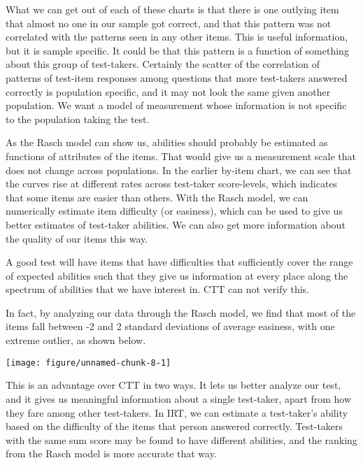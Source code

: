 \documentclass{article}\usepackage[]{graphicx}\usepackage[]{color}
\newenvironment{knitrout}{}{} %
\begin{document}
\begin{enumerate}
What we can get out of each of these charts is that there is one outlying item that almost no one in our sample got correct, and that this pattern was not correlated with the patterns seen in any other items. This is useful information, but it is sample specific. It could be that this pattern is a function of something about this group of test-takers. Certainly the scatter of the correlation of patterns of test-item responses among questions that more test-takers answered correctly is population specific, and it may not look the same given another population. We want a model of measurement whose information is not specific to the population taking the test.
\raggedright

As the Rasch model can show us, abilities should probably be estimated as functions of attributes of the items. That would give us a measurement scale that does not change across populations. In the earlier by-item chart, we can see that the curves rise at different rates across test-taker score-levels, which indicates that some items are easier than others. With the Rasch model, we can numerically estimate item difficulty (or easiness), which can be used to give us better estimates of test-taker abilities. We can also get more information about the quality of our items this way.
\raggedright

A good test will have items that have difficulties that sufficiently cover the range of expected abilities such that they give us information at every place along the spectrum of abilities that we have interest in. CTT can not verify this.
\raggedright

In fact, by analyzing our data through the Rasch model, we find that most of the items fall between -2 and 2 standard deviations of average easiness, with one extreme outlier, as shown below.

\centering
\begin{knitrout}
\color{fgcolor}

{\centering \texttt{[image: figure/unnamed-chunk-8-1]} 

}



\end{knitrout}
\raggedright
This is an advantage over CTT in two ways. It lets us better analyze our test, and it gives us meaningful information about a single test-taker, apart from how they fare among other test-takers. In IRT, we can estimate a test-taker's ability based on the difficulty of the items that person answered correctly. Test-takers with the same sum score may be found to have different abilities, and the ranking from the Rasch model is more accurate that way. 


\end{enumerate}
\end{document}
